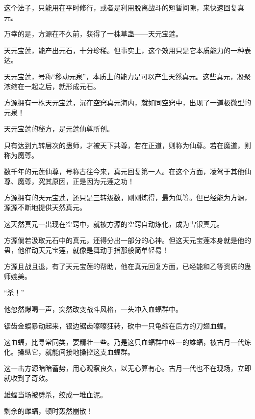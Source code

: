 \begin{this_body}
这个法子，只能用在平时修行，或者是利用脱离战斗的短暂间隙，来快速回复真元。

万幸的是，方源在不久前，获得了一株草蛊——天元宝莲。

天元宝莲，能产出元石，十分珍稀。但事实上，这个效用只是它本质能力的一种表达。

天元宝莲，号称“移动元泉”，本质上的能力是可以产生天然真元。这些真元，凝聚浓缩在一起之后，就形成元石。

方源拥有一株天元宝莲，沉在空窍真元海内，就如同空窍中，出现了一道极微型的元泉！

天元宝莲的秘方，是元莲仙尊所创。

只有达到九转层次的蛊师，才被天下共尊，若在正道，则称为仙尊。若在魔道，则称为魔尊。

数千年的元莲仙尊，号称古往今来，真元回复第一人。在这个方面，凌驾于其他仙尊、魔尊，究其原因，正是因为元莲之功！

方源拥有的天元宝莲，还只是三转级数，刚刚炼得，最为低等。但已经能为方源，源源不断地提供天然真元。

这天然真元一出现在空窍中，就被方源的空窍自动炼化，成为雪银真元。

方源倘若汲取元石中的真元，还得分出一部分的心神。但这天元宝莲本身就是他的蛊，他催动天元宝莲，就像是舞动手指那般简单轻易！

方源且战且退，有了天元宝莲的帮助，他在真元回复方面，已经能和乙等资质的蛊师媲美。

“杀！”

他忽然爆喝一声，突然改变战斗风格，一头冲入血蝠群中。

锯齿金蜈暴动起来，银边锯齿嚓嚓狂转，砍中一只龟缩在后方的刀翅血蝠。

这血蝠，比寻常同类，要精壮一些。乃是这只血蝠群中唯一的雄蝠，被古月一代炼化。操纵它，就能间接地操控这支血蝠群。

这一击方源暗暗蓄势，用心观察良久，以无心算有心。古月一代也不在现场，立即就收到了奇效。

雄蝠当场被劈杀，绞成一堆血泥。

剩余的雌蝠，顿时轰然崩散！

\end{this_body}

